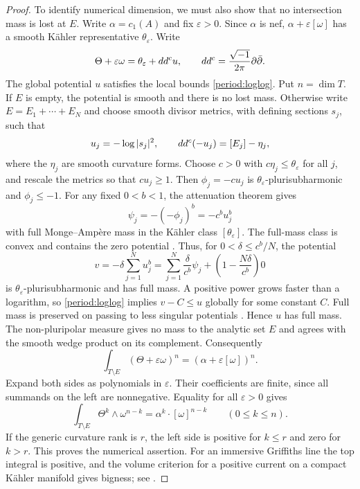 \begin{proof}
To identify numerical dimension, we must also show that no
intersection mass is lost at $E$.  Write $\alpha=c_1(A)$ and fix
$\varepsilon>0$.  Since $\alpha$ is nef, $\alpha+\varepsilon[\omega]$
has a smooth Kähler representative
$\theta_\varepsilon$.  Write
\[
 \Theta+\varepsilon\omega=\theta_\varepsilon+dd^c u,
 \qquad dd^c=\frac{\sqrt{-1}}{2\pi}\partial\bar\partial.
\]
The global potential $u$ satisfies the local bounds
\eqref{period:loglog}. Put $n=\dim T$. If $E$ is empty, the potential
is smooth and there is no lost mass. Otherwise write
$E=E_1+\cdots+E_N$ and choose smooth divisor metrics, with defining
sections $s_j$, such that
\[
 u_j=-\log|s_j|^2,\qquad
 dd^c(-u_j)=[E_j]-\eta_j,
\]
where the $\eta_j$ are smooth curvature forms. Choose $c>0$ with
$c\eta_j\leq\theta_\varepsilon$ for all $j$, and rescale the metrics
so that $cu_j\geq1$. Then $\phi_j=-cu_j$ is
$\theta_\varepsilon$-plurisubharmonic and $\phi_j\leq-1$.
For any fixed $0<b<1$, the attenuation theorem
\cite[Example~2.14]{GuedjZeriahiEnergy} gives
\[
 \psi_j=-(-\phi_j)^b=-c^bu_j^b
\]
with full Monge--Amp\`ere mass in the K\"ahler class
$[\theta_\varepsilon]$. The full-mass class is convex and contains
the zero potential \cite[Proposition~1.6]{GuedjZeriahiEnergy}.
Thus, for $0<\delta\leq c^b/N$, the potential
\begin{equation}\label{period:barrier}
 v=-\delta\sum_{j=1}^N u_j^b
   =\sum_{j=1}^N\frac{\delta}{c^b}\psi_j
      +\left(1-\frac{N\delta}{c^b}\right)0
\end{equation}
is $\theta_\varepsilon$-plurisubharmonic and has full mass. A positive power grows
faster than a logarithm, so \eqref{period:loglog} implies
$v-C\leq u$ globally for some constant $C$.
Full mass is preserved on passing to less singular potentials
\cite[Propositions~2.11(i) and~2.14(i)]{BEGZ}. Hence $u$ has full mass.
The non-pluripolar measure gives no mass to the analytic set $E$ and
agrees with the smooth wedge product on its complement. Consequently
\[
 \int_{T\setminus E}(\Theta+\varepsilon\omega)^n
                  =(\alpha+\varepsilon[\omega])^n.
\]
Expand both sides as polynomials in $\varepsilon$.  Their coefficients
are finite, since all summands on the left are nonnegative.  Equality
for all $\varepsilon>0$ gives
\begin{equation}
\label{period:masses}
 \int_{T\setminus E}\Theta^k\wedge\omega^{n-k}
                         =\alpha^k\cdot[\omega]^{n-k}
                         \qquad(0\leq k\leq n).
\end{equation}
If the generic curvature rank is $r$, the left side is positive for
$k\leq r$ and zero for $k>r$.  This proves the numerical assertion.
For an immersive Griffiths line the top integral is positive, and
the volume criterion for a positive current on a compact Kähler
manifold gives bigness; see \cite{BoucksomVolume}.
\end{proof}

